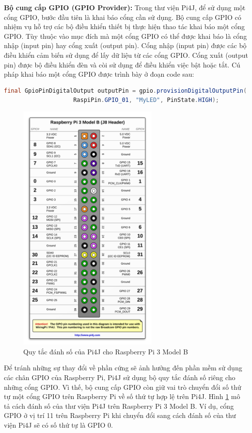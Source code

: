 \documentclass[12pt,a4paper,oneside]{extbook}
\begin{document}
\textbf{Bộ cung cấp GPIO (GPIO Provider):} Trong thư viện Pi4J, để sử dụng một cổng GPIO, bước đầu tiên là khai báo cổng cần sử dụng. Bộ cung cấp GPIO có nhiệm vụ hỗ trợ các bộ điều khiển thiết bị thực hiện thao tác khai báo một cổng GPIO. Tùy thuộc vào mục đích mà một cổng GPIO có thể được khai báo là cổng nhập (input pin) hay cổng xuất (output pin). Cổng nhập (input pin) được các bộ điều khiển cảm biến sử dụng để lấy dữ liệu từ các cổng GPIO. Cổng xuất (output pin) được bộ điều khiển đèn và còi sử dụng để điều khiển việc bật hoặc tắt. Cú pháp khai báo một cổng GPIO được trình bày ở đoạn code sau:

\begin{lstlisting}[language=Java, label={lst:declare-gpio}]
	final GpioPinDigitalOutput outputPin = gpio.provisionDigitalOutputPin(
					RaspiPin.GPIO_01, "MyLED", PinState.HIGH);
\end{lstlisting}

\begin{figure}[h]
  \centering
     \includegraphics[width=7cm]{4-pi4j-danh-so}
  \caption{Quy tắc đánh số của Pi4J cho Raspberry Pi 3 Model B}\label{fig:4-pi4j-danh-so}
\end{figure}

Để tránh những sự thay đổi về phần cứng sẽ ảnh hưởng đến phần mềm sử dụng các chân GPIO của Raspberry Pi, Pi4J sử dụng bộ quy tắc đánh số riêng cho những cổng GPIO. Vì thế, bộ cung cấp GPIO còn giữ vai trò chuyển đổi số thứ tự một cổng GPIO trên Raspberry Pi về số thứ tự hợp lệ trên Pi4J. Hình \ref{fig:4-pi4j-danh-so} mô tả cách đánh số của thư viện Pi4J trên Raspberry Pi 3 Model B. Ví dụ, cổng GPIO ở vị trí 11 trên Raspberry Pi khi chuyển đổi sang cách đánh số của thư viện Pi4J sẽ có số thứ tự là GPIO 0.
\end{document}
